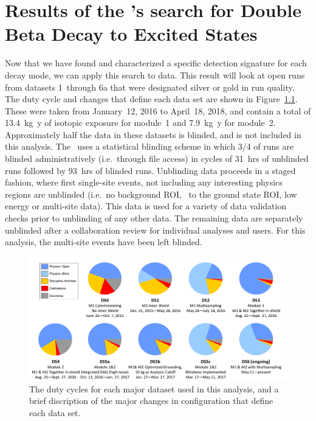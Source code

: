 \documentclass[/main.tex]{subfiles}
\begin{document}
\onlyinsubfile{\textpages}
\chapter{Results of the \MJD's search for Double Beta Decay to Excited States}
Now that we have found and characterized a specific detection signature for each decay mode, we can apply this search to data.
This result will look at open runs from datasets 1~through 6a that were designated silver or gold in run quality.
The duty cycle and changes that define each data set are shown in Figure~\ref{fig:dutycycle}.
These were taken from January~12, 2016 to April~18, 2018, and contain a total of 13.4~kg~y of isotopic exposure for module~1 and 7.9~kg~y for module~2.
Approximately half the data in these datasets is blinded, and is not included in this analysis.
The \MJD\ uses a statistical blinding scheme in which 3/4 of runs are blinded administratively (i.e.~through file access) in cycles of 31~hrs of unblinded runs followed by 93~hrs of blinded runs.
Unblinding data proceeds in a staged fashion, where first single-site events, not including any interesting physics regions are unblinded (i.e.~no background ROI, \znbb\ to the ground state ROI, low energy or multi-site data).
This data is used for a variety of data validation checks prior to unblinding of any other data.
The remaining data are separately unblinded after a collaboration review for individual analyses and users.
For this analysis, the multi-site events have been left blinded.

\begin{figure}[h]
  \centering
  \includegraphics[width=0.9\linewidth]{dutycycle}
  \caption[Dataset and Duty Cycle Summary]{\label{fig:dutycycle}
    The duty cycles for each major dataset used in this analysis, and a brief discription of the major changes in configuration that define each data set.
  }
\end{figure}
\end{document}
